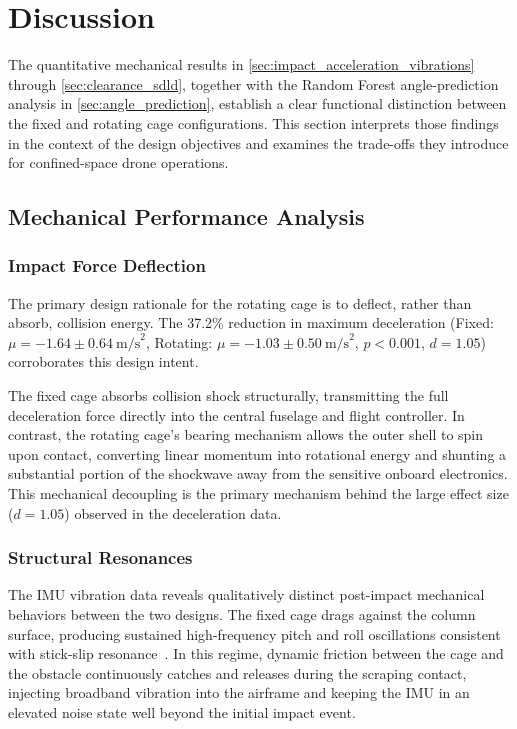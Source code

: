 \clearpage
\section{Discussion}
\label{sec:discussion}

The quantitative mechanical results in \autoref{sec:impact_acceleration_vibrations} through \autoref{sec:clearance_sdld}, together with the Random Forest angle-prediction analysis in \autoref{sec:angle_prediction}, establish a clear functional distinction between the fixed and rotating cage configurations. This section interprets those findings in the context of the design objectives and examines the trade-offs they introduce for confined-space drone operations.\medskip

\subsection{Mechanical Performance Analysis}

\subsubsection{Impact Force Deflection}

The primary design rationale for the rotating cage is to deflect, rather than absorb, collision energy. The 37.2\% reduction in maximum deceleration (Fixed: $\mu = -1.64 \pm 0.64\:\text{m/s}^2$, Rotating: $\mu = -1.03 \pm 0.50\:\text{m/s}^2$, $p < 0.001$, $d = 1.05$) corroborates this design intent.

The fixed cage absorbs collision shock structurally, transmitting the full deceleration force directly into the central fuselage and flight controller. In contrast, the rotating cage's bearing mechanism allows the outer shell to spin upon contact, converting linear momentum into rotational energy and shunting a substantial portion of the shockwave away from the sensitive onboard electronics. This mechanical decoupling is the primary mechanism behind the large effect size ($d = 1.05$) observed in the deceleration data.

\subsubsection{Structural Resonances}

The IMU vibration data reveals qualitatively distinct post-impact mechanical behaviors between the two designs. The fixed cage drags against the column surface, producing sustained high-frequency pitch and roll oscillations consistent with stick-slip resonance~\cite{bowden2001friction}.
In this regime, dynamic friction between the cage and the obstacle continuously catches and releases during the scraping contact, injecting broadband vibration into the airframe and keeping the IMU in an elevated noise state well beyond the initial impact event.

